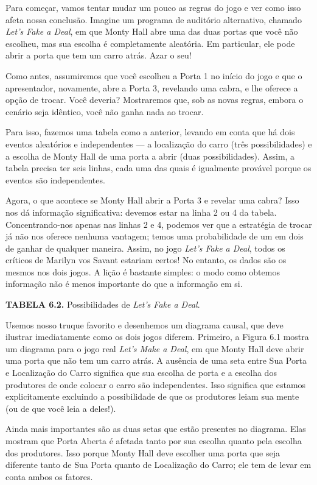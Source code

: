 \documentclass[11pt,a5paper,twoside]{book}
\begin{document}
Para começar, vamos tentar mudar um pouco as regras do jogo e ver como isso afeta nossa conclusão. Imagine um programa de auditório alternativo, chamado \textit{Let’s Fake a Deal}, em que Monty Hall abre uma das duas portas que você não escolheu, mas sua escolha é completamente aleatória. Em particular, ele pode abrir a porta que tem um carro atrás. Azar o seu!

Como antes, assumiremos que você escolheu a Porta 1 no início do jogo e que o apresentador, novamente, abre a Porta 3, revelando uma cabra, e lhe oferece a opção de trocar. Você deveria? Mostraremos que, sob as novas regras, embora o cenário seja idêntico, você não ganha nada ao trocar.

Para isso, fazemos uma tabela como a anterior, levando em conta que há dois eventos aleatórios e independentes — a localização do carro (três possibilidades) e a escolha de Monty Hall de uma porta a abrir (duas possibilidades). Assim, a tabela precisa ter seis linhas, cada uma das quais é igualmente provável porque os eventos são independentes.

Agora, o que acontece se Monty Hall abrir a Porta 3 e revelar uma cabra? Isso nos dá informação significativa: devemos estar na linha 2 ou 4 da tabela. Concentrando-nos apenas nas linhas 2 e 4, podemos ver que a estratégia de trocar já não nos oferece nenhuma vantagem; temos uma probabilidade de um em dois de ganhar de qualquer maneira. Assim, no jogo \textit{Let’s Fake a Deal}, todos os críticos de Marilyn vos Savant estariam certos! No entanto, os dados são os mesmos nos dois jogos. A lição é bastante simples: o modo como obtemos informação não é menos importante do que a informação em si.

\textbf{TABELA 6.2.} Possibilidades de \textit{Let’s Fake a Deal}.

Usemos nosso truque favorito e desenhemos um diagrama causal, que deve ilustrar imediatamente como os dois jogos diferem. Primeiro, a Figura 6.1 mostra um diagrama para o jogo real \textit{Let’s Make a Deal}, em que Monty Hall deve abrir uma porta que não tem um carro atrás. A ausência de uma seta entre Sua Porta e Localização do Carro significa que sua escolha de porta e a escolha dos produtores de onde colocar o carro são independentes. Isso significa que estamos explicitamente excluindo a possibilidade de que os produtores leiam sua mente (ou de que você leia a deles!).

Ainda mais importantes são as duas setas que estão presentes no diagrama. Elas mostram que Porta Aberta é afetada tanto por sua escolha quanto pela escolha dos produtores. Isso porque Monty Hall deve escolher uma porta que seja diferente tanto de Sua Porta quanto de Localização do Carro; ele tem de levar em conta ambos os fatores.
\end{document}
